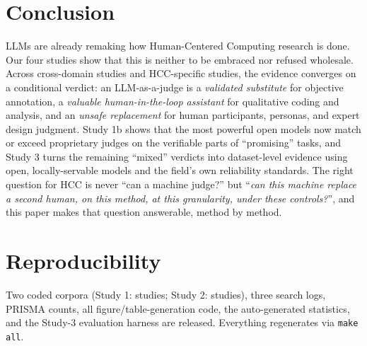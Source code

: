 \section{Conclusion}
LLMs are already remaking how Human-Centered Computing research is done. Our four studies show that this is neither
to be embraced nor refused wholesale. Across \Nstudies{} cross-domain studies and \STN{} HCC-specific studies, the
evidence converges on a conditional verdict: an LLM-as-a-judge is a \emph{validated substitute} for objective
annotation, a \emph{valuable human-in-the-loop assistant} for qualitative coding and analysis, and an
\emph{unsafe replacement} for human participants, personas, and expert design judgment. Study 1b shows that the most
powerful open models now match or exceed proprietary judges on the verifiable parts of ``promising'' tasks, and
Study 3 turns the remaining ``mixed'' verdicts into dataset-level evidence using open, locally-servable models and
the field's own reliability standards. The right question for HCC is never ``can a machine judge?'' but ``\emph{can this machine
replace a second human, on this method, at this granularity, under these controls?}'', and this paper makes that
question answerable, method by method.

\section*{Reproducibility}
Two coded corpora (Study 1: \Nstudies{} studies; Study 2: \STN{} studies), three search logs, PRISMA counts, all
figure/table-generation code, the auto-generated statistics, and the Study-3 evaluation harness are released.
Everything regenerates via \texttt{make all}.
